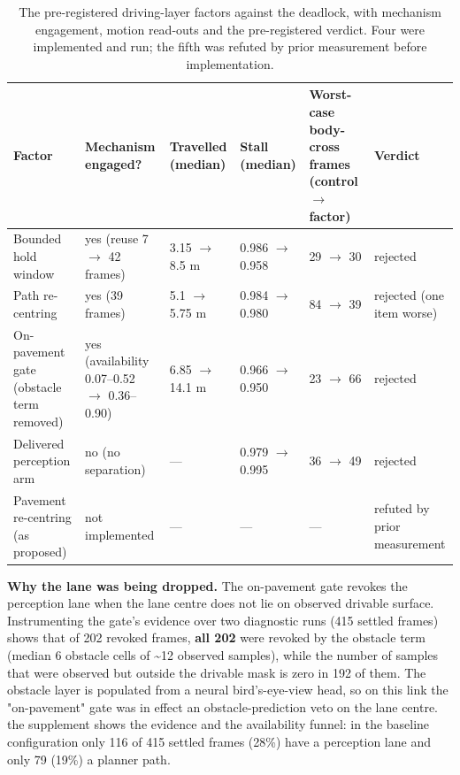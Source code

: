 \documentclass[journal]{IEEEtran}
\begin{document}
\begin{table}[!t]
\centering
\caption{The pre-registered driving-layer factors against the deadlock, with mechanism engagement,
motion read-outs and the pre-registered verdict. Four were implemented and run; the fifth was refuted by
prior measurement before implementation.}
\begin{tabular}{@{}llllll@{}}
\toprule
Factor & Mechanism engaged? & Travelled (median) & Stall (median) & Worst-case body-cross frames (control $\rightarrow$ factor) & Verdict \\
\midrule
Bounded hold window & yes (reuse 7 $\rightarrow$ 42 frames) & 3.15 $\rightarrow$ 8.5 m & 0.986 $\rightarrow$ 0.958 & 29 $\rightarrow$ 30 & rejected \\
Path re-centring & yes (39 frames) & 5.1 $\rightarrow$ 5.75 m & 0.984 $\rightarrow$ 0.980 & 84 $\rightarrow$ 39 & rejected (one item worse) \\
On-pavement gate (obstacle term removed) & yes (availability 0.07--0.52 $\rightarrow$ 0.36--0.90) & 6.85 $\rightarrow$ 14.1 m & 0.966 $\rightarrow$ 0.950 & 23 $\rightarrow$ 66 & rejected \\
Delivered perception arm & no (no separation) & --- & 0.979 $\rightarrow$ 0.995 & 36 $\rightarrow$ 49 & rejected \\
Pavement re-centring (as proposed) & not implemented & --- & --- & --- & refuted by prior measurement \\
\bottomrule
\end{tabular}
\end{table}
\textbf{Why the lane was being dropped.} The on-pavement gate revokes the perception lane when the lane
centre does not lie on observed drivable surface. Instrumenting the gate's evidence over two
diagnostic runs (415 settled frames) shows that of 202 revoked frames, \textbf{all 202} were revoked by the
obstacle term (median 6 obstacle cells of \textasciitilde{}12 observed samples), while the number of samples that
were observed but outside the drivable mask is zero in 192 of them. The obstacle layer is populated
from a neural bird's-eye-view head, so on this link the "on-pavement" gate was in effect an
obstacle-prediction veto on the lane centre. the supplement shows the evidence and the availability funnel:
in the baseline configuration only 116 of 415 settled frames (28\%) have a perception lane and only
79 (19\%) a planner path.
\end{document}
